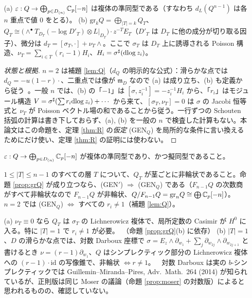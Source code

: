 \begin{prop}\label{prop:grQ}
(a) $\varepsilon:Q\to\bigoplus_{p\in D_{(n)}}\mathbb C_p[-n]$ は複体の準同型である（すなわち $d_L(Q^{n-1})$ は各 $n$ 重点で値 0 をとる）。
(b) $\mathrm{gr}_kQ=\bigoplus_{|T|=k}Q_T$、$Q_T\cong\bigl(\wedge^\bullet T_{D_T}(-\log D'_T)\otimes L|_{D_T}\bigr)\cdot z^{-T}E_T$（$D'_T$ は $D_T$ に他の成分が切り取る因子）、微分は $d_T=[\sigma_T,\cdot]+\nu_T\wedge$。ここで $\sigma_T$ は $D_T$ 上に誘導される Poisson 構造、$\nu_T=\sum_{i\in T}(r_i-1)H_i$、$H_i=\sigma^\sharp(\mathrm{dlog}\, z_i)$。
\end{prop}
\begin{proof}[状態と根拠]
$n=2$ は補題 \ref{lem:Q}（$d_Q$ の明示的な公式）：滑らかな点では $d_Q=-u(1-r)\cdot$、二重点では像が $\mathfrak m_D$ なので (a) は成り立ち、(b) も定義から従う\tP\ \tV。一般 $n$ では、(b) の「$-1$」は $[\sigma,z_i^{-1}]=-z_i^{-1}H_i$ から、「$r_i$」はモジュール構造 $V=\sigma^\sharp(\sum r_i\mathrm{dlog}\, z_i)+\cdots$ から来て、$[\sigma_T,\nu_T]=0$ は $\sigma$ の Jacobi 恒等式と $\nu_T$ が Poisson ベクトル場の和であることから従う。一行ずつの Schouten 括弧の計算は書き下しておらず、(a), (b) を一般の $n$ で検査した計算もない。本論文はこの命題を、定理 \ref{thm:R} の\emph{仮定} (GEN$_Q$) を局所的な条件に言い換えるためにだけ使い、定理 \ref{thm:R} の証明には使わない。\tQ
\end{proof}

\begin{defn}\label{defn:GEN}
$\varepsilon:Q\to\bigoplus_{p\in D_{(n)}}\mathbb C_p[-n]$ が複体の準同型であり、かつ擬同型であること。
\end{defn}
\begin{defn}[条件 (GEN$'$)]
$1\le|T|\le n-1$ のすべての層 $T$ について、$Q_T$ が茎ごとに非輪状であること。命題 \ref{prop:grQ} が成り立つなら、(GEN$'$) $\Rightarrow$ (GEN$_Q$) である（$F_{n-1}Q$ の次数商がすべて非輪状なので $F_{n-1}Q$ が非輪状、$Q/F_{n-1}Q=\mathrm{gr}_nQ\cong\bigoplus\mathbb C_p[-n]$）\tQ。$n=2$ では (GEN$_Q$) $\iff$ すべての $r_i\ne1$（補題 \ref{lem:Q}）\tP。
\end{defn}

\begin{prop}\label{prop:genNec}
(a) $\nu_T\equiv0$ なら $Q_T$ は $\sigma_T$ の Lichnerowicz 複体で、局所定数の Casimir が $H^0$ に入る。特に $|T|=1$ で $r_i\ne1$ が必要。\tP\ \tQ（命題 \ref{prop:grQ}(b) に依存）
(b) $|T|=1$、$D$ の滑らかな点では、対数 Darboux 座標で $\sigma=E_z\wedge\partial_{w_1}+\sum_j\partial_{w_{2j}}\wedge\partial_{w_{2j+1}}$ と書けるとき $\nu=(r-1)\partial_{w_1}$、$Q$ はシンプレクティック部分の Lichnerowicz 複体への $(r-1)\cdot\mathrm{id}$ の写像錐で、非輪状 $\iff r\ne1$。\tC\ \tQ\ 対数 Darboux は実の $b$-シンプレクティックでは Guillemin--Miranda--Pires, Adv.\ Math.\ 264 (2014) が知られているが、正則版は同じ Moser の議論（命題 \ref{prop:moser} の対数版）によると思われるものの、確認していない。
\end{prop}

